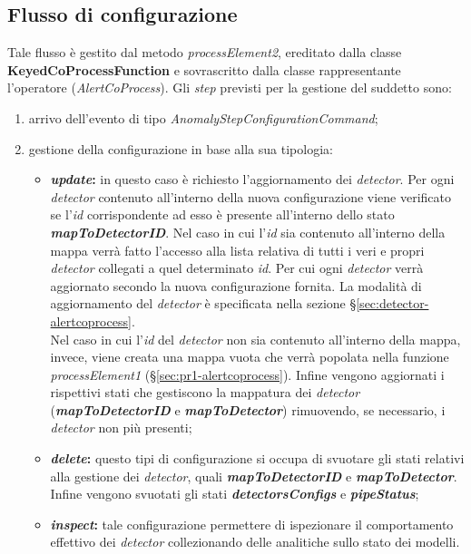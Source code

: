 \subsection{Flusso di configurazione}\label{sec:pr2-alertcoprocess}
Tale flusso è gestito dal metodo \textit{processElement2}, ereditato dalla classe \textbf{KeyedCoProcessFunction} e sovrascritto dalla classe rappresentante l'operatore (\textit{AlertCoProcess}). Gli \textit{step} previsti per la gestione del suddetto sono:

\begin{enumerate}
	\item{arrivo dell'evento di tipo \textit{AnomalyStepConfigurationCommand};}
	\item{gestione della configurazione in base alla sua tipologia:
	\begin{itemize}
		\item{\textbf{\textit{update}:} in questo caso è richiesto l'aggiornamento dei \textit{detector}. Per ogni \textit{detector} contenuto all'interno della nuova configurazione viene verificato se l'\textit{id} corrispondente ad esso è presente all'interno dello stato \textbf{\textit{mapToDetectorID}}. Nel caso in cui l'\textit{id} sia contenuto all'interno della mappa verrà fatto l'accesso alla lista relativa di tutti i veri e propri \textit{detector} collegati a quel determinato \textit{id}. Per cui ogni \textit{detector} verrà aggiornato secondo la nuova configurazione fornita. La modalità di aggiornamento del \textit{detector} è specificata nella sezione \S\ref{sec:detector-alertcoprocess}.\\
		Nel caso in cui l'\textit{id} del \textit{detector} non sia contenuto all'interno della mappa, invece, viene creata una mappa vuota che verrà popolata nella funzione \textit{processElement1} (\S\ref{sec:pr1-alertcoprocess}). Infine vengono aggiornati i rispettivi stati che gestiscono la mappatura dei \textit{detector} (\textbf{\textit{mapToDetectorID}} e \textbf{\textit{mapToDetector}}) rimuovendo, se necessario, i \textit{detector} non più presenti;}
		\item{\textbf{\textit{delete}:} questo tipi di configurazione si occupa di svuotare gli stati relativi alla gestione dei \textit{detector}, quali \textbf{\textit{mapToDetectorID}} e \textbf{\textit{mapToDetector}}. Infine vengono svuotati gli stati \textbf{\textit{detectorsConfigs}} e \textbf{\textit{pipeStatus}};}
		\item{\textbf{\textit{inspect}:} tale configurazione permettere di ispezionare il comportamento effettivo dei \textit{detector} collezionando delle analitiche sullo stato dei modelli.}
	\end{itemize}}
\end{enumerate}


